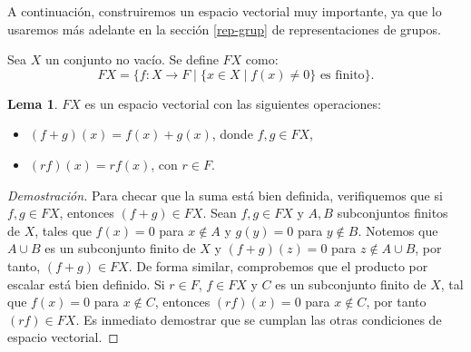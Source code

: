 \documentclass[12pt]{book}
\theoremstyle{definition}
\newtheorem{lemma}[theorem]{Lema}
\newcounter{in}
\newcounter{ini}
\begin{document}
A continuación, construiremos un espacio vectorial muy importante, ya
que lo usaremos más adelante en la sección \ref{rep-grup}
de representaciones de grupos.

Sea $X$ un conjunto no vacío. Se define $FX$ como:
\begin{equation*}
  FX=\{f:X\rightarrow F\mid \{x\in X\mid f(x)\neq 0\} \mbox{ es finito}\}.
\end{equation*}

\begin{lemma}
  \label{FX}
  $FX$ es un espacio vectorial con las siguientes operaciones:
  \begin{itemize}
  \item $(f+g)(x)=f(x)+g(x)$, donde $f,g\in FX$,
  \item $(rf)(x)=rf(x)$, con $r\in F$.
  \end{itemize}
\end{lemma}

\begin{proof}[Demostración]
  Para checar que la suma está bien definida, verifiquemos que si
  $f,g\in FX$, entonces $(f+g) \in FX$. Sean $f,g\in FX$ y $A,B$
  subconjuntos finitos de $X$, tales que $f(x)=0$ para $x\not\in A$ y
  $g(y)=0$ para $y\not\in B$. Notemos que $A\cup B$ es un
  subconjunto finito de $X$ y $(f+g)(z)=0$ para $z\not\in A\cup
  B$, por tanto, $(f+g) \in FX$. De forma similar, comprobemos que el
  producto por escalar está bien definido. Si $r\in F$, $f\in FX$ y
  $C$ es un subconjunto finito de $X$, tal que $f(x)=0$ para $x\not\in
  C$, entonces $(rf)(x)=0$ para $x\not\in C$, por tanto~$(rf)\in
  FX$. Es inmediato demostrar que se cumplan las otras condiciones de
  espacio vectorial.
\end{proof}
\end{document}
